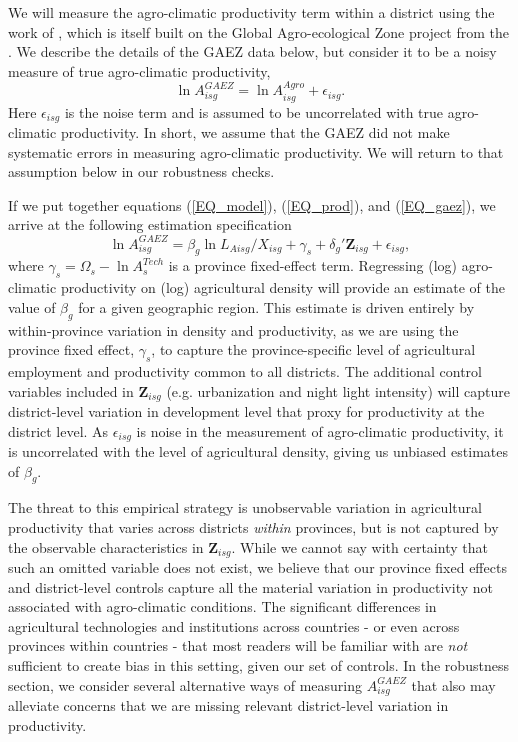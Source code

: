 \documentclass[11pt]{article}
\begin{document}
We will measure the agro-climatic productivity term within a district using the work of \cite{galorozak2016}, which is itself built on the Global Agro-ecological Zone project from the \cite{gaez}. We describe the details of the GAEZ data below, but consider it to be a noisy measure of true agro-climatic productivity,
\begin{equation}
	\ln A_{isg}^{GAEZ} = \ln A_{isg}^{Agro} + \epsilon_{isg}. \label{EQ_gaez}
\end{equation}
Here $\epsilon_{isg}$ is the noise term and is assumed to be uncorrelated with true agro-climatic productivity. In short, we assume that the GAEZ did not make systematic errors in measuring agro-climatic productivity. We will return to that assumption below in our robustness checks.

If we put together equations (\ref{EQ_model}), (\ref{EQ_prod}), and (\ref{EQ_gaez}), we arrive at the following estimation specification 
\begin{equation}
	\ln A^{GAEZ}_{isg} = \beta_g \ln L_{Aisg}/X_{isg} + \gamma_{s} + \delta_g' \mathbf{Z}_{isg} + \epsilon_{isg}, \label{EQ_regress}
\end{equation}
where $\gamma_s = \Omega_s - \ln A_{s}^{Tech}$ is a province fixed-effect term. Regressing (log) agro-climatic productivity on (log) agricultural density will provide an estimate of the value of $\beta_g$ for a given geographic region. This estimate is driven entirely by within-province variation in density and productivity, as we are using the province fixed effect, $\gamma_s$, to capture the province-specific level of agricultural employment and productivity common to all districts. The additional control variables included in $\mathbf{Z}_{isg}$ (e.g. urbanization and night light intensity) will capture district-level variation in development level that proxy for productivity at the district level. As $\epsilon_{isg}$ is noise in the measurement of agro-climatic productivity, it is uncorrelated with the level of agricultural density, giving us unbiased estimates of $\beta_g$.

The threat to this empirical strategy is unobservable variation in agricultural productivity that varies across districts \textit{within} provinces, but is not captured by the observable characteristics in $\mathbf{Z}_{isg}$. While we cannot say with certainty that such an omitted variable does not exist, we believe that our province fixed effects and district-level controls capture all the material variation in productivity not associated with agro-climatic conditions. The significant differences in agricultural technologies and institutions across countries -  or even across provinces within countries - that most readers will be familiar with are \textit{not} sufficient to create bias in this setting, given our set of controls. In the robustness section, we consider several alternative ways of measuring $A^{GAEZ}_{isg}$ that also may alleviate concerns that we are missing relevant district-level variation in productivity.
\end{document}
